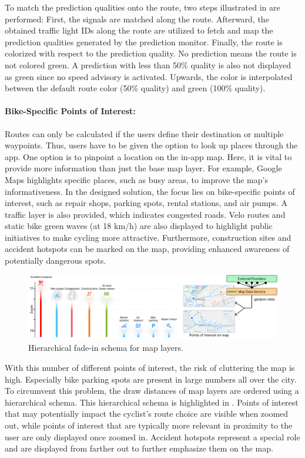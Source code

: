 To match the prediction qualities onto the route, two steps illustrated in  are performed: First, the signals are matched along the route. Afterward, the obtained traffic light IDs along the route are utilized to fetch and map the prediction qualities generated by the prediction monitor. Finally, the route is colorized with respect to the prediction quality. No prediction means the route is not colored green. A prediction with less than 50\% quality is also not displayed as green since no speed advisory is activated. Upwards, the color is interpolated between the default route color (50\% quality) and green (100\% quality). 

\paragraph{Bike-Specific Points of Interest:} Routes can only be calculated if the users define their destination or multiple waypoints. Thus, users have to be given the option to look up places through the app. One option is to pinpoint a location on the in-app map. Here, it is vital to provide more information than just the base map layer. For example, Google Maps highlights specific places, such as busy areas, to improve the map's informativeness. In the designed solution, the focus lies on bike-specific points of interest, such as repair shops, parking spots, rental stations, and air pumps. A traffic layer is also provided, which indicates congested roads. Velo routes and static bike green waves (at 18 km/h) are also displayed to highlight public initiatives to make cycling more attractive. Furthermore, construction sites and accident hotspots can be marked on the map, providing enhanced awareness of potentially dangerous spots.

\begin{figure}[htbp]
\centering
\includegraphics[width=\linewidth]{images/points-of-interest.png}
\caption{Hierarchical fade-in schema for map layers.}
\label{fig:points-of-interest}
\end{figure}

With this number of different points of interest, the risk of cluttering the map is high. Especially bike parking spots are present in large numbers all over the city. To circumvent this problem, the draw distances of map layers are ordered using a hierarchical schema. This hierarchical schema is highlighted in . Points of interest that may potentially impact the cyclist's route choice are visible when zoomed out, while points of interest that are typically more relevant in proximity to the user are only displayed once zoomed in. Accident hotspots represent a special role and are displayed from farther out to further emphasize them on the map.

